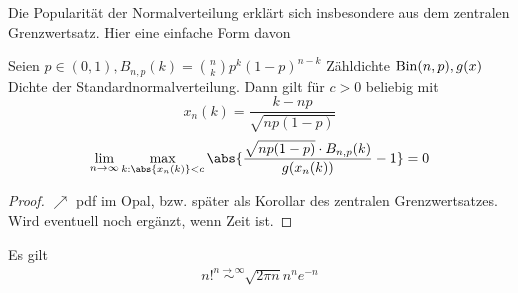 Die Popularität der Normalverteilung erklärt sich insbesondere aus dem zentralen Grenzwertsatz. Hier eine einfache Form davon
\begin{proposition}
	Seien $p \in (0,1), B_{n,p}(k) = \binom{n}{k}p^k(1-p)^{n-k}$ Zähldichte $\operatorname{Bin}(n,p), g(x)$ Dichte der Standardnormalverteilung. Dann gilt für $c>0$ beliebig mit
	\[
		x_n(k) = \frac{k-np}{\sqrt{np(1-p)}}
	\]
	\begin{align*}
		\lim_{n\to \infty} \max_{k:\abs{x_n(k)} < c} \abs{\frac{\sqrt{np(1-p)}\cdot B_{n,p}(k)}{g(x_n(k))} -1} = 0
	\end{align*}
\end{proposition}
\begin{proof}
	$\nearrow$ pdf im Opal, bzw. später als Korollar des zentralen Grenzwertsatzes. Wird eventuell noch ergänzt, wenn Zeit ist.
\end{proof}
\begin{lemma}
	Es gilt 
	\begin{align*}
		n! \overset{n \to \infty}{\sim} \sqrt{2\pi n}n^n e^{-n}
	\end{align*}
\end{lemma}
